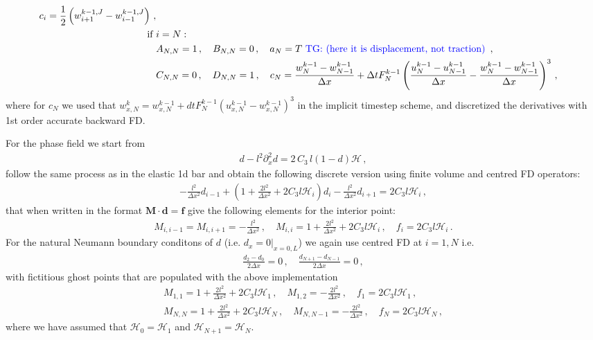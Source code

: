 \documentclass[11pt,a4paper]{article}
\newcommand{\p}{\partial}
\newcommand{\tg}[1]{\textcolor{blue}{TG: #1} }
\newcommand{\bb}[1]{\boldsymbol{#1}}
\begin{document}
\begin{align}
    c_i = \frac{1}{2}\left(w^{k-1,J}_{i+1}-w^{k-1,J}_{i-1}\right)
    \,,
    \nonumber
    \\
    \text{if } 
    &i=N:
    \nonumber
    \\
    &
    A_{N,N} = 1
    \,,
    \quad
    B_{N,N} = 0 
    \,, \quad
    a_N =  T \text{ \tg{(here it is displacement, not traction)}}
    \,,
    \nonumber
    \\
    &
    C_{N,N} = 0
    \,, \quad
    D_{N,N} = 1
    \,, \quad
    c_N = \frac{w^{k-1}_N - w^{k-1}_{N-1}}{\Delta x} + \Delta t F^{k-1}_N 
    \left( \frac{u^{k-1}_N - u^{k-1}_{N-1}}{\Delta x}
    -\frac{w^{k-1}_N - w^{k-1}_{N-1}}{\Delta x}\right)^3
    \,,
    \nonumber
\end{align}
where for $c_N$ we used that $w_{x,N}^k = w_{x,N}^{k-1} + dt F_N^{k-1} \left(u_{x,N}^{k-1}-w_{x,N}^{k-1}\right)^3$ in the implicit timestep scheme, and discretized the derivatives with 1st order accurate backward FD.

For the phase field we start from 
\begin{align*}
    d - l^2 \p_x^2 d = 2 \, C_3 \, l (1-d) \mathcal{H}
    \,, 
\end{align*}
follow the same process as in the elastic 1d bar and obtain the following discrete version using finite volume and centred FD operators:
\begin{align*}
    - \frac{l^2}{\Delta x^2} d_{i-1} 
    + \left(1 + \frac{2 l^2}{\Delta x^2} + 2 C_3 l \mathcal{H}_i \right) d_i
    - \frac{l^2}{\Delta x^2} d_{i+1}
    = 2 C_3 l \mathcal{H}_i
    \,,
\end{align*}
that when written in the format $\bb{M} \cdot \bb{d} = \bb{f}$ give the following elements for the interior point:
\begin{align*}
    M_{i,i-1} = M_{i,i+1} = -\frac{l^2}{\Delta x^2}
    \,, \quad
    M_{i,i} = 1 + \frac{2 l^2}{\Delta x^2} + 2 C_3 l \mathcal{H}_i
    \,, \quad
    f_{i} = 2 C_3 l \mathcal{H}_i
    \,.
\end{align*}
For the natural Neumann boundary conditons of $d$ (i.e. $d_x=0|_{x=0,L}$) we again use centred FD at $i=1,N$ i.e.
\begin{align*}
    \frac{d_2 - d_0}{2\Delta x} = 0
    \,, \quad
    \frac{d_{N+1} - d_{N-1}}{2\Delta x} = 0
    \,,
\end{align*}
with fictitious ghost points that are populated with the above implementation 
\begin{align*}
    M_{1,1} = 1 + \frac{2 l^2}{\Delta x^2} + 2 C_3 l \mathcal{H}_1
    \,, \quad
    M_{1,2} = - \frac{2 l^2}{\Delta x^2}
    \,, \quad
    f_1 = 2 C_3 l \mathcal{H}_1
    \,,
    \\
    M_{N,N} = 1 + \frac{2 l^2}{\Delta x^2} + 2 C_3 l \mathcal{H}_N
    \,, \quad
    M_{N,N-1} = - \frac{2 l^2}{\Delta x^2}
    \,, \quad
    f_N = 2 C_3 l \mathcal{H}_N
    \,,
\end{align*}
where we have assumed that $\mathcal{H}_0=\mathcal{H}_1$ and $\mathcal{H}_{N+1}=\mathcal{H}_N$.
\end{document}
